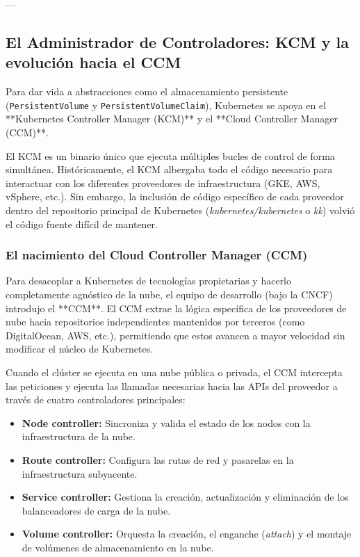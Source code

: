 ---

\subsection{El Administrador de Controladores: KCM y la evolución hacia el CCM}

Para dar vida a abstracciones como el almacenamiento persistente (\texttt{PersistentVolume} y \texttt{PersistentVolumeClaim}), Kubernetes se apoya en el **Kubernetes Controller Manager (KCM)** y el **Cloud Controller Manager (CCM)**. 

El KCM es un binario único que ejecuta múltiples bucles de control de forma simultánea. Históricamente, el KCM albergaba todo el código necesario para interactuar con los diferentes proveedores de infraestructura (GKE, AWS, vSphere, etc.). Sin embargo, la inclusión de código específico de cada proveedor dentro del repositorio principal de Kubernetes (\textit{kubernetes/kubernetes} o \textit{kk}) volvió el código fuente difícil de mantener.

\subsubsection{El nacimiento del Cloud Controller Manager (CCM)}
Para desacoplar a Kubernetes de tecnologías propietarias y hacerlo completamente agnóstico de la nube, el equipo de desarrollo (bajo la CNCF) introdujo el **CCM**. El CCM extrae la lógica específica de los proveedores de nube hacia repositorios independientes mantenidos por terceros (como DigitalOcean, AWS, etc.), permitiendo que estos avancen a mayor velocidad sin modificar el núcleo de Kubernetes.

Cuando el clúster se ejecuta en una nube pública o privada, el CCM intercepta las peticiones y ejecuta las llamadas necesarias hacia las APIs del proveedor a través de cuatro controladores principales:
\begin{itemize}
    \item \textbf{Node controller:} Sincroniza y valida el estado de los nodos con la infraestructura de la nube.
    \item \textbf{Route controller:} Configura las rutas de red y pasarelas en la infraestructura subyacente.
    \item \textbf{Service controller:} Gestiona la creación, actualización y eliminación de los balanceadores de carga de la nube.
    \item \textbf{Volume controller:} Orquesta la creación, el enganche (\textit{attach}) y el montaje de volúmenes de almacenamiento en la nube.
\end{itemize}

